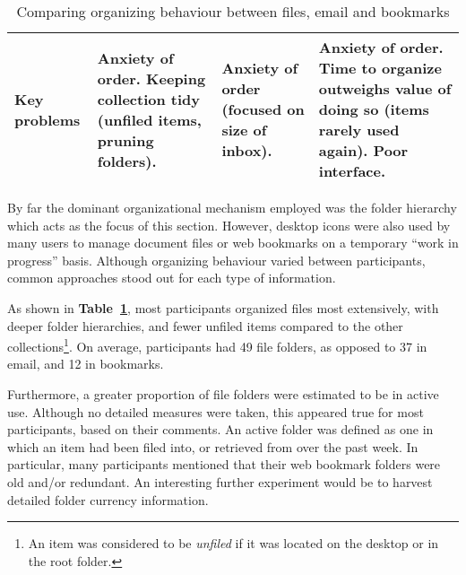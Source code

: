 \begin{table}[hbtp]
\begin{center}
\begin{footnotesize}
\begin{tabular}{|p{2.5cm}|p{3.5cm}|p{3.5cm}|p{3.5cm}|}
\hline
{\bf Key  problems} & Anxiety of order. Keeping collection tidy (unfiled items, pruning folders).  & Anxiety of order (focused on size of inbox). & Anxiety of order. Time to organize outweighs value of doing so (items rarely used again). Poor interface. \\
\hline
\end{tabular}  
\end{footnotesize}
\caption{Comparing organizing behaviour between files, email and bookmarks}
\label{table:chapter3_organization_strategy}
\end{center}
\end{table}

By far the dominant organizational mechanism employed was the folder hierarchy which acts as the focus of this section.  However, desktop icons were also used by many users to manage document files or web bookmarks on a temporary ``work in progress'' basis.  Although organizing behaviour varied between participants, common approaches stood out for each type of information.

As shown in \textbf{Table~\ref{table:chapter3_organization_strategy}}, most participants organized files most extensively, with deeper folder hierarchies, and fewer unfiled items compared to the other collections\footnote{An item was considered to be \textit{unfiled} if it was located on the desktop or in the root folder.}.  On average, participants had 49 file folders, as opposed to 37 in email, and 12 in bookmarks.

Furthermore, a greater proportion of file folders were estimated to be in active use.  Although no detailed measures were taken, this appeared true for most participants, based on their comments.  An active folder was defined as one in which an item had been filed into, or retrieved from over the past week.  In particular, many participants mentioned that their web bookmark folders were old and/or redundant. An interesting further experiment would be to harvest detailed folder currency information.

